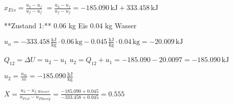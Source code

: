 \( x_{Eis} = \frac{u_2 - u_f}{u_f - u_f} \)  
\( = \frac{u_2 - u_f}{u_f - u_f} = -185.090 \, \text{kJ} + 333.458 \, \text{kJ} \)  

**Zustand 1:**  
0.06 kg Eis  
0.04 kg Wasser  

\( u_n = -333.458 \, \frac{\text{kJ}}{\text{kg}} \cdot 0.06 \, \text{kg} - 0.045 \, \frac{\text{kJ}}{\text{kg}} \cdot 0.04 \, \text{kg} = -20.009 \, \text{kJ} \)  

\( Q_{12} = \Delta U = u_2 - u_1 \)  
\( u_2 = Q_{12} + u_1 = -185.090 - 20.0097 = -185.090 \, \text{kJ} \)  

\( u_2 = \frac{u_m}{m} = -185.090 \, \frac{\text{kJ}}{\text{kg}} \)  

\( X = \frac{u_2 - u_{f, Wasser}}{u_{Fest} - u_{Flüssig}} = \frac{-185.090 + 0.045}{-333.458 + 0.045} = 0.555 \)